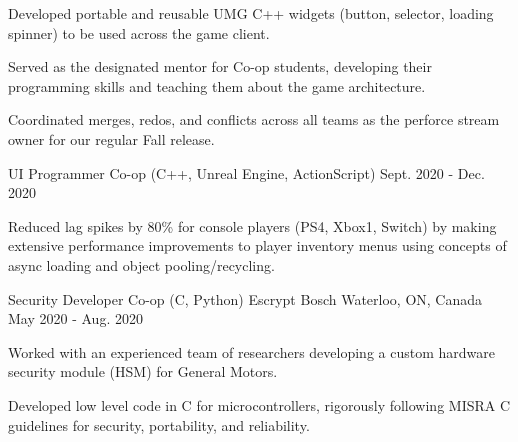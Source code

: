 \begin{cventries}
{\begin{cvitems}
\item Developed portable and reusable UMG C++ widgets (button, selector, loading spinner) to be used across the game client.
\item Served as the designated mentor for Co-op students, developing their programming skills and teaching them about the game architecture.
\item Coordinated merges, redos, and conflicts across all teams as the perforce stream owner for our regular Fall release. 
      \end{cvitems}
    }

  \cventry
    {UI Programmer Co-op (C++, Unreal Engine, ActionScript)} %
    {} %
    {} %
    {Sept. 2020 - Dec. 2020} %
    {
      \begin{cvitems} %
\item Reduced lag spikes by 80\% for console players (PS4, Xbox1, Switch) by making extensive performance improvements to player inventory menus using concepts of async loading and object pooling/recycling.
      \end{cvitems}
    }

  \cventry
    {Security Developer Co-op (C, Python)} %
    {Escrypt Bosch} %
    {Waterloo, ON, Canada} %
    {May 2020 - Aug. 2020} %
    {
      \begin{cvitems} %
\item Worked with an experienced team of researchers developing a custom hardware security module (HSM) for General Motors.
\item Developed low level code in C for microcontrollers, rigorously following MISRA C guidelines for security, portability, and reliability.
      \end{cvitems}
    }


\end{cventries}

